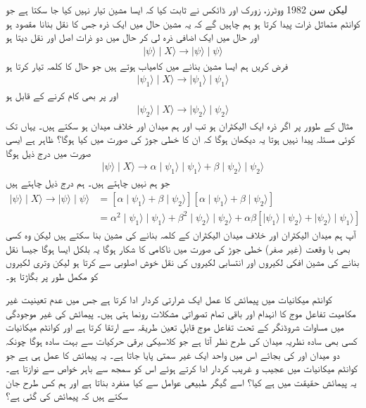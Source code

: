 لیکن سن \num{1982} ووٹرز، زورک اور ڈائکس نے ثابت کیا کہ ایسا مشین تیار نہیں کیا جا سکتا ہے جو کوانٹم متماثل ذرات پیدا کرتا ہو ہم چاہیں گے کہ یہ مشین حال  میں ایک ذرہ جس کا نقل بنانا مقصود ہو اور حال  میں ایک اضافی ذرہ لی کر  حال  میں دو ذرات  اصل اور نقل دیتا ہو 
\begin{align}
	\mid\psi\rangle\mid X\rangle\to\mid\psi\rangle\mid\psi\rangle
\end{align}
فرض کریں ہم ایسا مشین بنانے میں کامیاب ہوتے ہیں جو حال  کا کلمہ تیار کرتا ہو 
\begin{align}
	\mid\psi_1\rangle\mid X\rangle\to\mid\psi_1\rangle\mid\psi_1\rangle
\end{align}
اور  پر بھی کام کرنے کے قابل ہو
\begin{align}
	\mid\psi_2\rangle\mid X\rangle\to\mid\psi_2\rangle\mid\psi_2\rangle
\end{align}
مثال کے طوور پر اگر ذرہ ایک الیکٹران ہو تب  اور  ہم میدان اور خلاف میدان ہو سکتے ہیں۔ یہاں تک کوئی مسئلہ پیدا نہیں ہوتا یہ دیکھان ہوگا کہ ان کا خطی جوڑ  کی صورت میں کیا ہوگا؟ ظاہر ہے ایسی صورت میں درج ذیل ہوگا
\begin{align}
	\mid\psi\rangle\mid X\rangle\to\alpha\mid\psi_1\rangle\mid\psi_1\rangle+\beta\mid\psi_2\rangle\mid\psi_2\rangle
\end{align}
جو ہم نہیں چاہتے ہیں۔ ہم درج ذیل چاہتے ہیں  
\begin{align}
	\mid\psi\rangle\mid X\rangle\to\mid\psi\rangle\mid\psi\rangle &= [\alpha\mid\psi_1\rangle+\beta\mid\psi_2\rangle][\alpha\mid\psi_1\rangle+\beta\mid\psi_2\rangle]\nonumber \\
	&= \alpha^2\mid\psi_1\rangle\mid\psi_1\rangle+\beta^2\mid\psi_2\rangle\mid\psi_2\rangle+\alpha\beta[\mid\psi_1\rangle\mid\psi_2\rangle+\mid\psi_2\rangle\mid\psi_1\rangle]
\end{align}
آپ ہم میدان الیکٹران اور خلاف میدان الیکٹران کے کلمہ بنانے کی مشین بنا سکتے ہیں لیکن وہ کسی بھی با وقعت (غیر صفر)  خطی جوڑ کی صورت میں ناکامی کا شکار ہوگا یہ بلکل ایسا ہوگا جیسا نقل بنانے کی مشین  افکی لکیروں اور انتسابی لکیروں کی نقل خوش اصلوبی سے کرتا ہو لیکن وتری لکیروں کو مکمل طور پر بگاڑتا ہو۔

کوانٹم میکانیات میں پیمائش کا عمل ایک شرارتی کردار ادا کرتا ہے جس میں عدم تعینیت غیر مکامیت تفاعل موج کا انہدام اور باقی تمام تصوراتی مشکلات رونما ہتی ہیں۔ پیمائش کی غیر موجودگی میں مساوات شروڈنگر کے تحت تفاعل موج قابلِ تعین طریقہ سے ارتقا کرتا ہے اور کوانٹم میکانیات کسی بھی سادہ نظریہ میدان کی طرح نظر آتا ہے جو کلاسیکی برقی حرکیات سے بہت سادہ ہوگا چونکہ دو میدان  اور  کی بجائے اس میں واحد ایک غیر سمتی  پایا جاتا ہے۔ یہ پیمائش کا عمل ہی ہے جو کوانٹم میکانیات میں عجیب و غریب کردار ادا کرتے ہوئے اس کو سمجھ سے باہر خواص سے نوازتا ہے۔ یہ پیمائش حقیقت میں ہے کیا؟ اسے گیگر طبیعی عوامل سے کیا منفرد بناتا ہے اور ہم کس طرح جان سکتے ہیں کہ پیمائش کی گئی ہے؟

